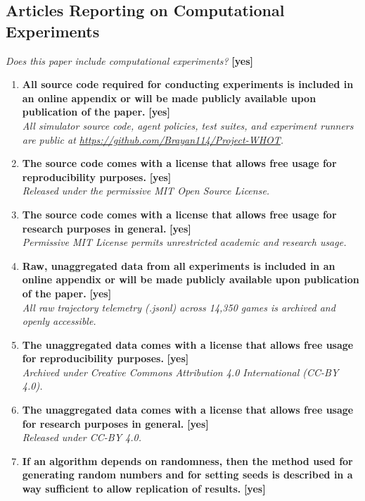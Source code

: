 \documentclass[11pt]{article}
\begin{document}
\subsection*{Articles Reporting on Computational Experiments}
\textit{Does this paper include computational experiments?} \hfill \textbf{[yes]}
\begin{enumerate}
  \item \textbf{All source code required for conducting experiments is included in an online appendix or will be made publicly available upon publication of the paper.} \hfill \textbf{[yes]} \\
  \textit{All simulator source code, agent policies, test suites, and experiment runners are public at \url{https://github.com/Brayan114/Project-WHOT}.}
  \item \textbf{The source code comes with a license that allows free usage for reproducibility purposes.} \hfill \textbf{[yes]} \\
  \textit{Released under the permissive MIT Open Source License.}
  \item \textbf{The source code comes with a license that allows free usage for research purposes in general.} \hfill \textbf{[yes]} \\
  \textit{Permissive MIT License permits unrestricted academic and research usage.}
  \item \textbf{Raw, unaggregated data from all experiments is included in an online appendix or will be made publicly available upon publication of the paper.} \hfill \textbf{[yes]} \\
  \textit{All raw trajectory telemetry (.jsonl) across 14,350 games is archived and openly accessible.}
  \item \textbf{The unaggregated data comes with a license that allows free usage for reproducibility purposes.} \hfill \textbf{[yes]} \\
  \textit{Archived under Creative Commons Attribution 4.0 International (CC-BY 4.0).}
  \item \textbf{The unaggregated data comes with a license that allows free usage for research purposes in general.} \hfill \textbf{[yes]} \\
  \textit{Released under CC-BY 4.0.}
  \item \textbf{If an algorithm depends on randomness, then the method used for generating random numbers and for setting seeds is described in a way sufficient to allow replication of results.} \hfill \textbf{[yes]} \\

\end{enumerate}
\end{document}
